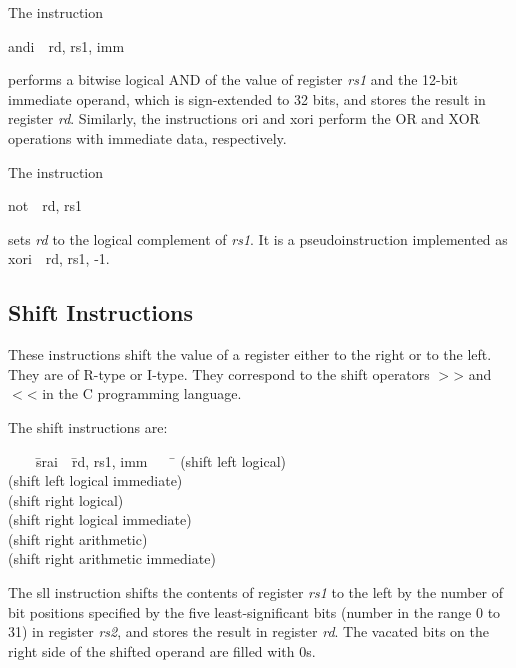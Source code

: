 \documentclass[11pt, twoside, pdftex]{article}
\newenvironment{ctabbing}%
{\begin{center}\begin{minipage}{\textwidth}\begin{tabbing}}
{\end{tabbing}\end{minipage}\end{center}}
\begin{document}
\noindent
The instruction
\vspace{-\baselineskip}
\begin{center}
{\sf andi~~rd, rs1, imm} 
\end{center}
\noindent
performs a bitwise logical AND of the value of register {\it rs1} and the 12-bit immediate
operand, which is sign-extended to 32 bits, and stores the result in register {\it rd}.
Similarly, the instructions {\sf ori} and {\sf xori} perform the OR and XOR operations 
with immediate data, respectively.
 
\noindent
The instruction
\vspace{-\baselineskip}
\begin{center}
{\sf not~~rd, rs1} 
\end{center}
\noindent
sets {\it rd} to the logical complement of {\it rs1}. It is a pseudoinstruction
implemented as {\sf xori~~rd, rs1, -1}.
\subsection{Shift Instructions}

These instructions shift the value of a register either to the right or to the left.
They are of R-type or I-type. They correspond to the shift operators $>$> and $<$< in the C 
programming language. 

The shift instructions are:
\vspace{-\baselineskip}
\begin{ctabbing}
~~~~\={\sf srai}~~\={\sf rd, rs1, imm}~~~~\=\kill
{}  \>(shift left logical)\\
  \>(shift left logical immediate)\\
  \>(shift right logical)\\
  \>(shift right logical immediate)\\
  \>(shift right arithmetic)\\
  \>(shift right arithmetic immediate)
\end{ctabbing}

\noindent
The {\sf sll} instruction shifts the contents of register {\it rs1} to the left by the number 
of bit positions specified by the five least-significant bits (number in the range 0 to 31)
in register {\it rs2}, and stores the result in register {\it rd}. The vacated bits on the
right side of the shifted operand are filled with 0s.
\end{document}

